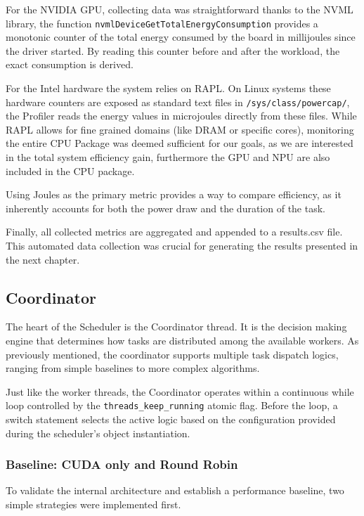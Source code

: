 For the NVIDIA GPU, collecting data was straightforward thanks to the NVML library, the function \texttt{nvmlDeviceGetTotalEnergyConsumption} provides a monotonic counter of the total energy consumed by the board in millijoules since the driver started. By reading this counter before and after the workload, the exact consumption is derived.

For the Intel hardware the system relies on RAPL. On Linux systems these hardware counters are exposed as standard text files in \texttt{/sys/class/powercap/}, the Profiler reads the energy values in microjoules directly from these files. While RAPL allows for fine grained domains (like DRAM or specific cores), monitoring the entire CPU Package was deemed sufficient for our goals, as we are interested in the total system efficiency gain, furthermore the GPU and NPU are also included in the CPU package.

Using Joules as the primary metric provides a way to compare efficiency, as it inherently accounts for both the power draw and the duration of the task.

Finally, all collected metrics are aggregated and appended to a results.csv file. This automated data collection was crucial for generating the results presented in the next chapter.

\clearpage

\subsection{Coordinator}
\label{implcoordinator}
The heart of the Scheduler is the Coordinator thread. It is the decision making engine that determines how tasks are distributed among the available workers. As previously mentioned, the coordinator supports multiple task dispatch logics, ranging from simple baselines to more complex algorithms.

Just like the worker threads, the Coordinator operates within a continuous while loop controlled by the \texttt{threads\_keep\_running} atomic flag. Before the loop, a switch statement selects the active logic based on the configuration provided during the scheduler's object instantiation.

\subsubsection{Baseline: CUDA only and Round Robin}
To validate the internal architecture and establish a performance baseline, two simple strategies were implemented first.

